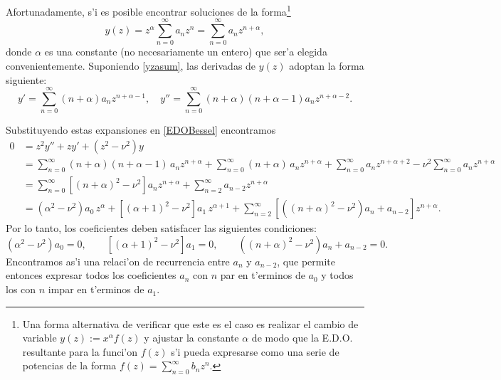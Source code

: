 Afortunadamente, s'i es posible encontrar soluciones de la forma\footnote{Una forma alternativa de verificar que este es el caso es realizar el cambio de variable $y(z):=x^\alpha f(z)$ y ajustar la constante $\alpha$ de modo que la E.D.O. resultante para la funci'on $f(z)$ s'i pueda expresarse como una serie de potencias de la forma $f(z) = \sum_{n=0}^\infty b_n z^n$.}
\begin{equation}\label{yzasum}
y(z) = z^\alpha \sum_{n=0}^\infty a_n z^n = \sum_{n=0}^\infty a_n z^{n+\alpha},
\end{equation}
donde $\alpha$ es una constante (no necesariamente un entero) que ser'a elegida convenientemente. Suponiendo \eqref{yzasum}, las derivadas de $y(z)$ adoptan la forma siguiente:
\begin{equation}
y' = \sum_{n=0}^\infty (n+\alpha) a_n z^{n+\alpha-1}, \quad
y'' = \sum_{n=0}^\infty (n+\alpha)(n+\alpha-1) a_n z^{n+\alpha-2}.
\end{equation}

Substituyendo estas expansiones en \eqref{EDOBessel} encontramos
\begin{align}
0 &=  z^2 y'' + z y' + \left( z^2 - \nu^2 \right) y  \\
  &= \sum_{n=0}^\infty (n+\alpha)(n +\alpha - 1)\, a_n z^{n+\alpha}
  + \sum_{n=0}^\infty (n+\alpha)\, a_n z^{n+\alpha} + \sum_{n=0}^\infty a_n z^{n+\alpha+2}
  - \nu^2\sum_{n=0}^\infty a_n z^{n+\alpha}  \\
 &=  \sum_{n=0}^\infty \left[ (n+\alpha)^2 -\nu^2 \right] a_n z^{n+\alpha}
  + \sum_{n=2}^\infty a_{n-2} z^{n+\alpha} \\
 &= (\alpha^2-\nu^2)a_0\,z^\alpha+\left[ (\alpha+1)^2 -\nu^2 \right] a_1\,z^{\alpha+1}
 + \sum_{n=2}^\infty \left[ \left( (n+\alpha)^2 -\nu^2 \right) a_n+a_{n-2}\right]  z^{n+\alpha}.
\end{align}
Por lo tanto, los coeficientes deben satisfacer las siguientes condiciones:
\begin{equation}\label{rrBess}
(\alpha^2-\nu^2)a_0=0,  \qquad \left[ (\alpha+1)^2 -\nu^2 \right] a_1=0, \qquad 
\left( (n+\alpha)^2 -\nu^2 \right) a_n+a_{n-2}=0.
\end{equation}
Encontramos as'i una relaci'on de recurrencia entre $a_n$ y $a_{n-2}$, que permite entonces expresar todos los coeficientes $a_n$ con $n$ par en t'erminos de $a_0$ y todos los con $n$ impar en t'erminos de $a_1$. 

